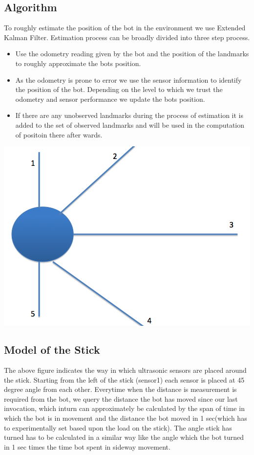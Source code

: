 \documentclass[12pt]{article}
\begin{document}
\subsection{Algorithm}
To roughly estimate the position of the bot in the environment we use Extended Kalman Filter. Estimation process can be broadly divided into three step process.
\begin{itemize}
\item Use the odometry reading given by the bot and the position of the landmarks to roughly approximate the bots position.
\item As the odometry is prone to error we use the sensor information to identify the position of the bot. Depending on the level to which we trust the odometry and sensor performance we update the bots position.
\item If there are any unobserved landmarks during the process of estimation it is added to the set of observed landmarks and will be used in the computation of positoin there after wards.
\end{itemize}
\begin{center} \includegraphics[scale=0.4]{sensor} \end{center}
\subsection{Model of the Stick}
The above figure indicates the way in which ultrasonic sensors are placed around the stick. Starting from the left of the stick (sensor1) each sensor is placed at 45 degree angle from each other. Everytime when the distance is measurement is required from the bot, we query the distance the bot has moved since our last invocation, which inturn can approximately be calculated by the span of time in which the bot is in movement and the distance the bot moved in 1 sec(which has to experimentally set based upon the load on the stick). The angle stick has turned has to be calculated in a similar way like the angle which the bot turned in 1 sec times the time bot spent in sideway movement.
\end{document}
